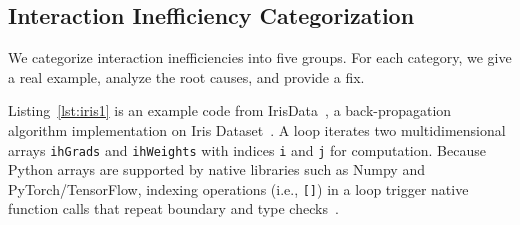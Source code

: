 





\subsection{Interaction Inefficiency Categorization}
\label{classification}

We categorize interaction inefficiencies into five groups. For each category, we give a real example, analyze the root causes, and provide a fix. 




Listing~\ref{lst:iris1} is an example code from IrisData~\cite{irisdata}, a back-propagation algorithm implementation on Iris Dataset~\cite{fisher1936use}. A loop iterates two multidimensional arrays {\tt ihGrads} and {\tt ihWeights} with indices {\tt i} and {\tt j}  for computation. 
Because Python arrays are supported by native libraries such as Numpy and PyTorch/TensorFlow, indexing operations (i.e., {\tt []}) in a loop trigger native function calls that repeat boundary and type checks~\cite{generalfunction}. 

